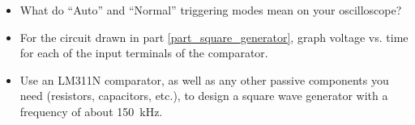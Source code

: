 \begin{itemize}


\item What do ``Auto'' and ``Normal'' triggering modes mean on your oscilloscope?

\item For the circuit drawn in part \ref{part_square_generator}, graph voltage vs. time for each of the input terminals of the comparator.


\item Use an LM311N comparator, as well as any other passive components you need (resistors, capacitors, etc.), to design a square wave generator with a frequency of about 150~kHz.

\end{itemize}






